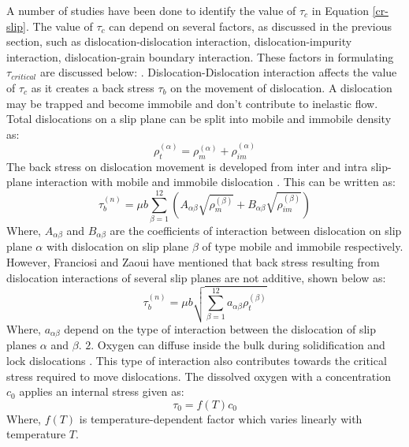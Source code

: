 A number of studies \cite{sumino1999deformation,franciosi1982multislip,cochard2013novel} have been done to identify the value of $\tau_{c}$ in Equation \ref{cr-slip}. The value of $\tau_{c}$ can depend on several factors, as discussed in the previous section, such as dislocation-dislocation interaction, dislocation-impurity interaction, dislocation-grain boundary interaction. 
These factors in formulating $\tau_{critical}$ are discussed below:
. Dislocation-Dislocation interaction affects the value of $\tau_{c}$ as it creates a back stress $\tau_{b}$ on the movement of dislocation. A dislocation may be trapped and become immobile and don't contribute to inelastic flow. Total dislocations on a slip plane can be split into mobile and immobile density as:
\begin{equation}
\rho ^{(\alpha)}_{t} = \rho ^{(\alpha)}_{m} + \rho ^{(\alpha)}_{im}
\label {d-d-i}
\end{equation}
The back stress on dislocation movement is developed from inter and intra slip-plane interaction with mobile and immobile dislocation \cite{cochard2013novel}. This can be written as: 
\begin{equation}
\tau^{(n)}_{b} = \mu b \sum_{\beta = 1}^{12} \left ( A_{\alpha \beta} \sqrt{\rho ^{(\beta)}_{m}} + 
                                                        B_{\alpha \beta} \sqrt{\rho ^{(\beta)}_{im}} \right )
\label {d-d-i2}
\end{equation}
Where, $A_{\alpha \beta}$ and $B_{\alpha \beta}$ are the coefficients of interaction between dislocation on slip plane $\alpha$ with dislocation on slip plane $\beta$ of type mobile and immobile respectively. However, Franciosi and Zaoui \cite{franciosi1982multislip} have mentioned that back stress resulting from dislocation interactions of several slip planes are not additive, shown below as:
\begin{equation}
\tau^{(n)}_{b} = \mu b \sqrt{\sum_{\beta = 1}^{12} a_{\alpha \beta} \rho ^{(\beta)}_{t}}
\label {d-d-i3}
\end{equation}
Where, $a_{\alpha \beta}$ depend on the type of interaction between the dislocation of slip planes $\alpha$ and $\beta$.
\newline
\newline
$2.$ Oxygen can diffuse inside the bulk during solidification and lock dislocations \cite{sumino1983interaction}. This type of interaction also contributes towards the critical stress required to move dislocations. The dissolved oxygen with a concentration $c_{0}$ applies an internal stress given as:
\begin{equation}
\tau_{0} = f(T) c_{0}
\label {d-d-i4}
\end{equation}
Where, $f(T)$ is temperature-dependent factor which varies linearly with temperature $T$.

